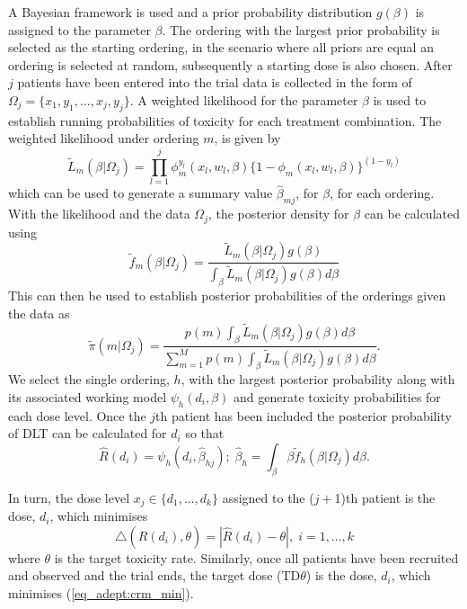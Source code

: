 A Bayesian framework is used and a prior probability distribution $g(\beta)$ is assigned to the parameter $\beta$. The ordering with the largest prior probability is selected as the starting ordering, in the scenario where all priors are equal an ordering is selected at random, subsequently a starting dose is also chosen. After $j$ patients have been entered into the trial data is collected in the form of $\Omega_j = \{x_1,y_1, ..., x_j,y_j\}$. A weighted likelihood for the parameter $\beta$ is used to establish running probabilities of toxicity for each treatment combination. The weighted likelihood under ordering $m$, is given by 
\begin{equation}
\tilde{L}_m(\beta|\Omega_j)=\prod_{l=1}^{j}\phi_m^{y_l}(x_l,w_l,\beta)\{1-\phi_m(x_l,w_l,\beta)\}^{(1-y_l)}
\end{equation} 
which can be used to generate a summary value $\hat{\beta}_{mj}$, for $\beta$, for each ordering. With the likelihood and the data $\Omega_j$, the posterior density for $\beta$ can be calculated using 
\begin{equation}
	\tilde{f}_m(\beta|\Omega_j)=\frac{\tilde{L}_m(\beta|\Omega_j)g(\beta)}{\int_{\beta}\tilde{L}_m(\beta|\Omega_j)g(\beta)d\beta}
\end{equation}
This can then be used to establish posterior probabilities of the orderings given the data as 
\begin{equation}
\tilde{\pi}(m|\Omega_j)=\frac{p(m)\int_{\beta}\tilde{L}_m(\beta|\Omega_j)g(\beta)d\beta}{\sum_{m=1}^{M}p(m)\int_{\beta}\tilde{L}_m(\beta|\Omega_j)g(\beta)d\beta}.
\end{equation}
We select the single ordering, $h$, with the largest posterior probability along with its associated working model $\psi_h(d_i,\beta)$ and generate toxicity probabilities for each dose level. Once the $j$th patient has been included the posterior probability of DLT can be calculated for $d_{i}$ so that
\begin{equation}
	\hat{R}(d_i) = \psi_h(d_i,\hat{\beta}_{hj}); \; \hat{\beta}_h = \int_{\beta}\beta\tilde{f}_h(\beta|\Omega_j)d\beta.
\end{equation}

In turn, the dose level $x_j \in \{d_1,...,d_k\}$ assigned to the ($j+$1)th patient is the dose, $d_i$, which minimises 
\begin{equation}
\label{eq_adept:crm_min}
	\triangle(\hat{R}(d_i),\theta) = |\hat{R}(d_i)-\theta|, \; i=1,...,k
\end{equation}
where $\theta$ is the target toxicity rate. Similarly, once all patients have been recruited and observed and the trial ends, the target dose (TD$\theta$) is the dose, $d_{i}$, which minimises (\ref{eq_adept:crm_min}).

